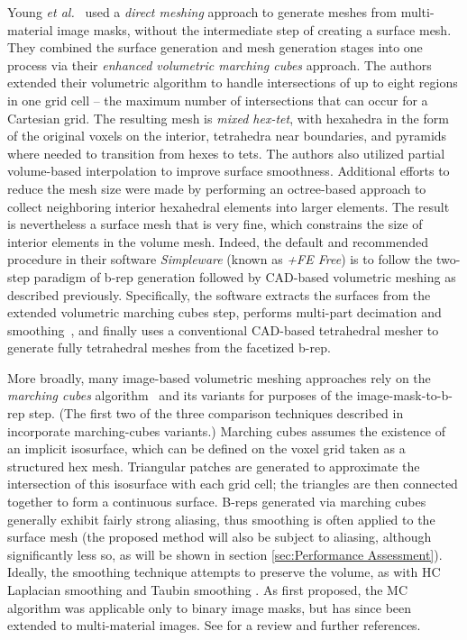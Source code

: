 Young \textit{et al.}~\cite{young_2008} used a \textit{direct meshing} approach to generate meshes from multi-material image masks, without the intermediate step of creating a surface mesh. They combined the surface generation and mesh generation stages into one process via their \textit{enhanced volumetric marching cubes} approach.  The authors extended their volumetric algorithm to handle intersections of up to eight regions in one grid cell -- the maximum number of intersections that can occur for a Cartesian grid.  The resulting mesh is \textit{mixed hex-tet}, with hexahedra in the form of the original voxels on the interior, tetrahedra near boundaries, and pyramids where needed to transition from hexes to tets. The authors also utilized partial volume-based interpolation to improve surface smoothness. Additional efforts to reduce the mesh size were made by performing an octree-based approach to collect neighboring interior hexahedral elements into larger elements.  The result is nevertheless a surface mesh that is very fine, which constrains the size of interior elements in the volume mesh.  Indeed, the default and recommended procedure in their software \textit{Simpleware} (known as \textit{+FE Free}) is to follow the two-step paradigm of b-rep generation followed by CAD-based volumetric meshing as described previously. Specifically, the software extracts the surfaces from the extended volumetric marching cubes step, performs multi-part decimation and smoothing~\cite{egst}, and finally uses a conventional CAD-based tetrahedral mesher to generate fully tetrahedral meshes from the facetized b-rep.

More broadly, many image-based volumetric meshing approaches rely on the \textit{marching cubes} algorithm~\cite{lorensen_1987} and its variants for purposes of the image-mask-to-b-rep step.  (The first two of the three comparison techniques described in  incorporate marching-cubes variants.)  Marching cubes assumes the existence of an implicit isosurface, which can be defined on the voxel grid taken as a structured hex mesh.  Triangular patches are generated to approximate the intersection of this isosurface with each grid cell; the triangles are then connected together to form a continuous surface. B-reps generated via marching cubes generally exhibit fairly strong aliasing, thus smoothing is often applied to the surface mesh (the proposed method will also be subject to aliasing, although significantly less so, as will be shown in section \ref{sec:Performance Assessment}). Ideally, the smoothing technique attempts to preserve the volume, as with HC Laplacian smoothing\cite{vollmer_1999} and Taubin smoothing \cite{taubin1995signal, taubin_1995}.  As first proposed, the MC algorithm was applicable only to binary image masks, but has since been extended to multi-material images.  See \cite{newman2006} for a review and further references.

